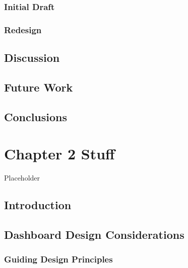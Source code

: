 \documentclass[print]{nuthesis}
\begin{document}
\hypertarget{initial-draft}{%
\subsection{Initial Draft}\label{initial-draft}}

\hypertarget{redesign}{%
\subsection{Redesign}\label{redesign}}

\hypertarget{discussion}{%
\section{Discussion}\label{discussion}}

\hypertarget{future-work}{%
\section{Future Work}\label{future-work}}

\hypertarget{conclusions}{%
\section{Conclusions}\label{conclusions}}

\hypertarget{math-sci}{%
\chapter{Chapter 2 Stuff}\label{math-sci}}

Placeholder

\hypertarget{introduction-2}{%
\section{Introduction}\label{introduction-2}}

\hypertarget{dashboard-design-considerations-1}{%
\section{Dashboard Design Considerations}\label{dashboard-design-considerations-1}}

\hypertarget{guiding-design-principles-1}{%
\subsection{Guiding Design Principles}\label{guiding-design-principles-1}}
\end{document}
